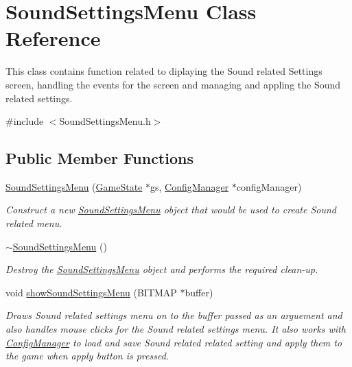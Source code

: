 \hypertarget{class_sound_settings_menu}{}\section{Sound\+Settings\+Menu Class Reference}
\label{class_sound_settings_menu}


This class contains function related to diplaying the Sound related Settings screen, handling the events for the screen and managing and appling the Sound related settings.  




{\ttfamily \#include $<$Sound\+Settings\+Menu.\+h$>$}

\subsection*{Public Member Functions}
\begin{DoxyCompactItemize}
\item 
\mbox{\hyperlink{class_sound_settings_menu_ac1858f00f1b84e7dea55bf98b9eab011}{Sound\+Settings\+Menu}} (\mbox{\hyperlink{struct_game_state}{Game\+State}} $\ast$gs, \mbox{\hyperlink{class_config_manager}{Config\+Manager}} $\ast$config\+Manager)
\begin{DoxyCompactList}\small\item\em Construct a new \mbox{\hyperlink{class_sound_settings_menu}{Sound\+Settings\+Menu}} object that would be used to create Sound related menu. \end{DoxyCompactList}\item 
\mbox{\hyperlink{class_sound_settings_menu_a84416928391210116c46bbb1deddf035}{$\sim$\+Sound\+Settings\+Menu}} ()
\begin{DoxyCompactList}\small\item\em Destroy the \mbox{\hyperlink{class_sound_settings_menu}{Sound\+Settings\+Menu}} object and performs the required clean-\/up. \end{DoxyCompactList}\item 
void \mbox{\hyperlink{class_sound_settings_menu_a3ac0e1463e67b8165cfd4491a251e5fa}{show\+Sound\+Settings\+Menu}} (B\+I\+T\+M\+AP $\ast$buffer)
\begin{DoxyCompactList}\small\item\em Draws Sound related settings menu on to the buffer passed as an arguement and also handles mouse clicks for the Sound related settings menu. It also works with \mbox{\hyperlink{class_config_manager}{Config\+Manager}} to load and save Sound related related setting and apply them to the game when apply button is pressed. \end{DoxyCompactList}\end{DoxyCompactItemize}


